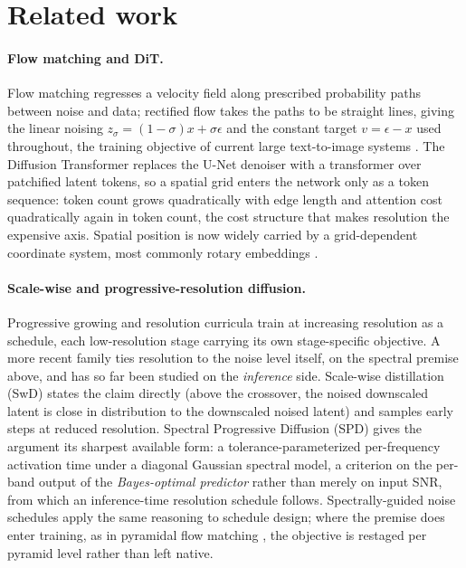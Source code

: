 \section{Related work}
\label{sec:related}

\paragraph{Flow matching and DiT.}
Flow matching \citep{lipman2023flow} regresses a velocity field along
prescribed probability paths between noise and data; rectified flow
\citep{liu2023rectified} takes the paths to be straight lines, giving
the linear noising $z_\sigma = (1-\sigma)x + \sigma\epsilon$ and the
constant target $v = \epsilon - x$ used throughout, the training
objective of current large text-to-image systems
\citep{esser2024scaling}. The Diffusion Transformer
\citep{peebles2023dit} replaces the U-Net denoiser with a transformer
over patchified latent tokens, so a spatial grid enters the network
only as a token sequence: token count grows quadratically with edge
length and attention cost quadratically again in token count, the cost
structure that makes resolution the expensive axis. Spatial position is
now widely carried by a grid-dependent coordinate system, most commonly
rotary embeddings \citep{su2024roformer}.

\paragraph{Scale-wise and progressive-resolution diffusion.}
Progressive growing \citep{karras2018progressive} and resolution
curricula \citep{chen2024pixartalpha,hoogeboom2023simple} train at
increasing resolution as a schedule, each low-resolution stage carrying
its own stage-specific objective. A more recent family ties resolution
to the noise level itself, on the spectral premise above, and has so
far been studied on the \emph{inference} side. Scale-wise distillation
(SwD) \citep{starodubcev2025swd} states the claim directly (above the
crossover, the noised downscaled latent is close in distribution to the
downscaled noised latent) and samples early steps at reduced
resolution. Spectral Progressive Diffusion (SPD) \citep{xiao2026spd}
gives the argument its sharpest available form: a
tolerance-parameterized per-frequency activation time under a diagonal
Gaussian spectral model, a criterion on the per-band output of the
\emph{Bayes-optimal predictor} rather than merely on input SNR, from
which an inference-time resolution schedule follows. Spectrally-guided
noise schedules \citep{esteves2026spectral} apply the same reasoning
to schedule design; where the premise does enter training, as in
pyramidal flow matching \citep{jin2024pyramidal}, the objective is
restaged per pyramid level rather than left native.

